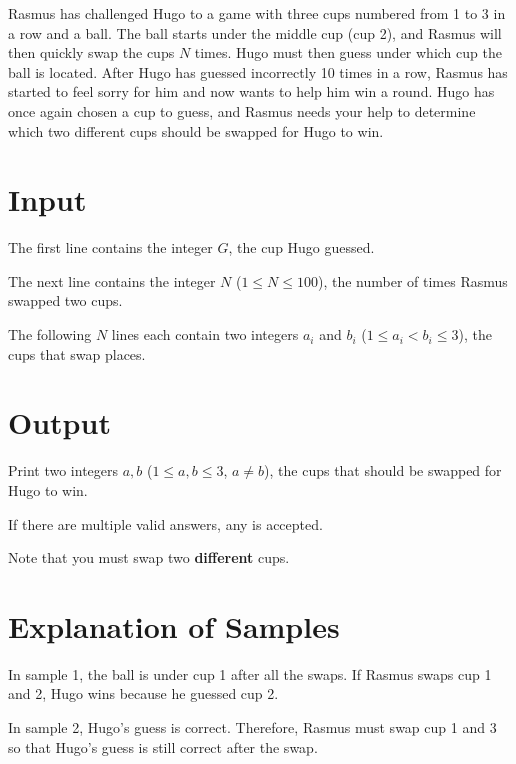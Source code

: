 
Rasmus has challenged Hugo to a game with three cups numbered from 1 to 3 in a row and a ball.
The ball starts under the middle cup (cup 2), and Rasmus will then quickly swap the cups $N$ times.
Hugo must then guess under which cup the ball is located. After Hugo has guessed incorrectly 10 times
in a row, Rasmus has started to feel sorry for him and now wants to help him win a round. Hugo has
once again chosen a cup to guess, and Rasmus needs your help to determine which two different cups
should be swapped for Hugo to win.

\section*{Input}
The first line contains the integer $G$, the cup Hugo guessed.

The next line contains the integer $N$ ($1 \le N \le 100$), the number of times Rasmus swapped two cups.

The following $N$ lines each contain two integers $a_i$ and $b_i$ ($1 \le a_i < b_i \le 3$), the cups that swap places.

\section*{Output}
Print two integers $a,b$ ($1 \leq a,b \leq 3$, $a \neq b$), the cups that should be swapped for Hugo to win.

If there are multiple valid answers, any is accepted.

Note that you must swap two \textbf{different} cups.

\section*{Explanation of Samples}
In sample 1, the ball is under cup 1 after all the swaps. If Rasmus swaps cup 1 and 2, Hugo wins because he guessed cup 2.

In sample 2, Hugo's guess is correct. Therefore, Rasmus must swap cup 1 and 3 so that Hugo's guess is still correct after the swap.
